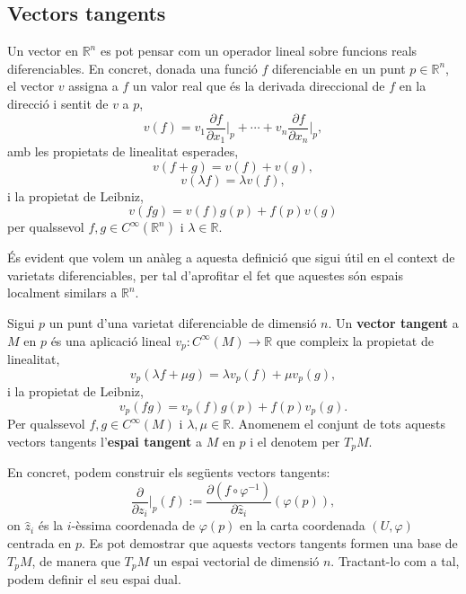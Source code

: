 \subsection{Vectors tangents}
Un vector en $\mathbb R^n$ es pot pensar com un operador lineal sobre funcions reals diferenciables. En concret, donada una funció $f$ diferenciable en un punt $p\in\mathbb R^n$, el vector $v$ assigna a $f$ un valor real que és la derivada direccional de $f$ en la direcció i sentit de $v$ a $p$,
\begin{equation*}
    v(f) = v_1\frac{\partial f}{\partial x_1}\Big|_p + \cdots + v_n\frac{\partial f}{\partial x_n}\Big|_p,
\end{equation*}
amb les propietats de linealitat esperades,
\begin{equation*}
    v(f+g) = v(f) + v(g), 
\end{equation*}
\begin{equation*}
    v(\lambda f) = \lambda v(f),
\end{equation*}
i la propietat de Leibniz,
\begin{equation*}
    v(fg) = v(f)g(p) + f(p)v(g)
\end{equation*}
per qualssevol $f,g\in C^\infty(\mathbb R^n)$ i $\lambda\in\mathbb R$.

És evident que volem un anàleg a aquesta definició que sigui útil en el context de varietats diferenciables, per tal d'aprofitar el fet que aquestes són espais localment similars a $\mathbb R^n$. 

\begin{defi}
    Sigui $p$ un punt d'una varietat diferenciable de dimensió $n$. Un \textbf{vector tangent} a $M$ en $p$ és una aplicació lineal $v_p:C^\infty(M)\to\mathbb R$ que compleix la propietat de linealitat,
    \begin{equation*}
        v_p(\lambda f+\mu g) = \lambda v_p(f) + \mu v_p(g), 
    \end{equation*}
    i la propietat de Leibniz,
    \begin{equation*}
        v_p(fg) = v_p(f)g(p) + f(p)v_p(g).
    \end{equation*}
    Per qualssevol $f,g\in C^\infty(M)$ i $\lambda,\mu\in\mathbb R$.
    Anomenem el conjunt de tots aquests vectors tangents l'\textbf{espai tangent} a $M$ en $p$ i el denotem per $T_pM$.
\end{defi}

En concret, podem construir els següents vectors tangents:
\begin{equation*}
    \frac{\partial}{\partial z_i}\Big|_p(f) := \frac{\partial(f\circ\varphi^{-1})}{\partial \hat z_i}(\varphi(p)),
\end{equation*}
on $\hat z_i$ és la $i$-èssima coordenada de $\varphi(p)$ en la carta coordenada $(U,\varphi)$ centrada en $p$. Es pot demostrar que aquests vectors tangents formen una base de $T_pM$, de manera que $T_pM$ un espai vectorial de dimensió $n$. Tractant-lo com a tal, podem definir el seu espai dual.

